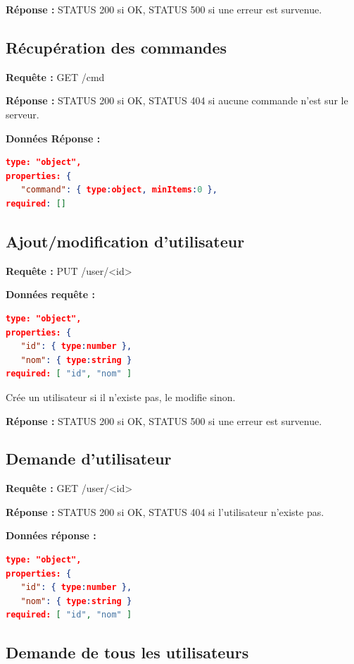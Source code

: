 \documentclass[12pt,a4paper]{report}
\begin{document}
\textbf{Réponse :} STATUS 200 si OK, STATUS 500 si une erreur est survenue.

\subsection{Récupération des commandes}

\textbf{Requête :} GET /cmd


\textbf{Réponse :} STATUS 200 si OK, STATUS 404 si aucune commande n'est sur le serveur.

\textbf{Données Réponse :} 

\begin{lstlisting}[language=JSON]
type: "object",
properties: {
   "command": { type:object, minItems:0 },
required: []
\end{lstlisting}


\subsection{Ajout/modification d'utilisateur}

\textbf{Requête :} PUT /user/<id>


\textbf{Données requête :} 

\begin{lstlisting}[language=JSON]
type: "object",
properties: {
   "id": { type:number },
   "nom": { type:string }
required: [ "id", "nom" ]
\end{lstlisting}

Crée un utilisateur si il n'existe pas, le modifie sinon.


\textbf{Réponse :} STATUS 200 si OK, STATUS 500 si une erreur est survenue.

\subsection{Demande d'utilisateur}

\textbf{Requête :} GET /user/<id>


\textbf{Réponse :} STATUS 200 si OK, STATUS 404 si l'utilisateur n'existe pas.

\textbf{Données réponse :} 

\begin{lstlisting}[language=JSON]
type: "object",
properties: {
   "id": { type:number },
   "nom": { type:string }
required: [ "id", "nom" ]
\end{lstlisting}

\subsection{Demande de tous les utilisateurs}
\end{document}

